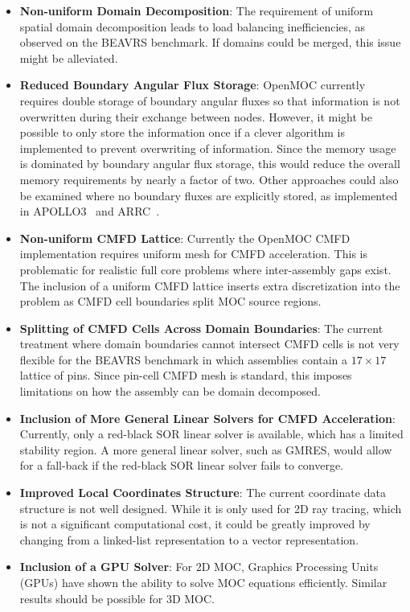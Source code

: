 \begin{itemize}
	\item \textbf{Non-uniform Domain Decomposition}: The requirement of uniform spatial domain decomposition leads to load balancing inefficiencies, as observed on the BEAVRS benchmark. If domains could be merged, this issue might be alleviated.
	
	\item \textbf{Reduced Boundary Angular Flux Storage}: OpenMOC currently requires double storage of boundary angular fluxes so that information is not overwritten during their exchange between nodes. However, it might be possible to only store the information once if a clever algorithm is implemented to prevent overwriting of information. Since the memory usage is dominated by boundary angular flux storage, this would reduce the overall memory requirements by nearly a factor of two. Other approaches could also be examined where no boundary fluxes are explicitly stored, as implemented in APOLLO3~\cite{apollo3_exp} and ARRC~\cite{trrm_new}.
	
	\item \textbf{Non-uniform \ac{CMFD} Lattice}: Currently the OpenMOC \ac{CMFD} implementation requires uniform mesh for \ac{CMFD} acceleration. This is problematic for realistic full core problems where inter-assembly gaps exist. The inclusion of a uniform \ac{CMFD} lattice inserts extra discretization into the problem as \ac{CMFD} cell boundaries split \ac{MOC} source regions.
	
	\item \textbf{Splitting of \ac{CMFD} Cells Across Domain Boundaries}: The current treatment where domain boundaries cannot intersect \ac{CMFD} cells is not very flexible for the BEAVRS benchmark in which assemblies contain a $17 \times 17$ lattice of pins. Since pin-cell \ac{CMFD} mesh is standard, this imposes limitations on how the assembly can be domain decomposed. 
	
	\item \textbf{Inclusion of More General Linear Solvers for \ac{CMFD} Acceleration}: Currently, only a red-black SOR linear solver is available, which has a limited stability region. A more general linear solver, such as \ac{GMRES}, would allow for a fall-back if the red-black SOR linear solver fails to converge. 
	
	\item \textbf{Improved Local Coordinates Structure}: The current coordinate data structure is not well designed. While it is only used for 2D ray tracing, which is not a significant computational cost, it could be greatly improved by changing from a linked-list representation to a vector representation.
	
	\item \textbf{Inclusion of a GPU Solver}: For 2D \ac{MOC}, Graphics Processing Units (GPUs) have shown the ability to solve \ac{MOC} equations efficiently. Similar results should be possible for 3D \ac{MOC}. 
\end{itemize}



